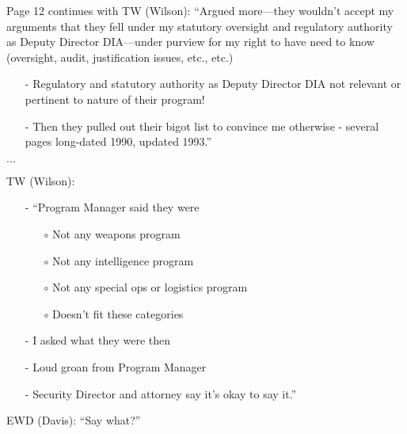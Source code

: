 \begin{svgraybox}
Page 12 continues with \noindent TW (Wilson): ``Argued more---they wouldn't accept my arguments that they fell under my statutory
oversight and regulatory authority as Deputy Director DIA---under purview for my right
to have need to know (oversight, audit, justification issues, etc., etc.)
\begin{enumerate}
\item[-]
Regulatory and statutory authority as Deputy Director DIA not relevant or pertinent to nature of their program!
\item[-]
Then they pulled out their bigot list to convince me otherwise - several pages long-dated 1990, updated 1993.''
\end{enumerate}
$\ldots$


\noindent TW (Wilson):
\begin{enumerate}
\item[-]
``Program Manager said they were
\begin{enumerate}
\item[$\circ$]  Not any weapons program
\item[$\circ$] Not any intelligence program
\item[$\circ$] Not any special ops or logistics program
\item[$\circ$] Doesn't fit these categories
\end{enumerate}
\item[-] I asked what they were then
\item[-] Loud groan from Program Manager
\item[-] Security Director and attorney say it's okay to say it.''
\end{enumerate}

\noindent EWD (Davis): ``Say what?''


\end{svgraybox}

